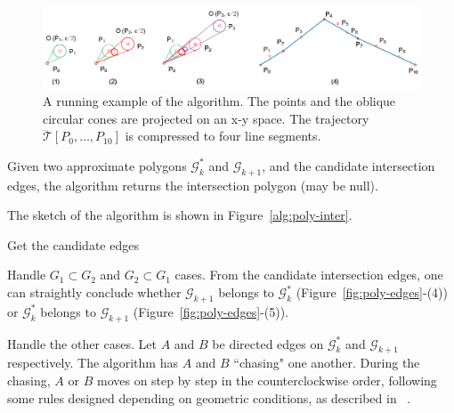 \begin{figure}[tb!]
\centering
\includegraphics[scale=0.8]{figures/Fig-ex-conest.png}
\vspace{-1ex}
\caption{\small A running example of the \cist algorithm. The points and the oblique circular cones are projected on an x-y space. The trajectory $\dddot{\mathcal{T}}[P_0, \ldots, P_{10}]$ is compressed to four line segments.}
\vspace{-2ex}
\label{fig:exm-const}
\end{figure}


\stitle{\textcolor[rgb]{0.00,0.07,1.00}{polygon intersection algorithm}}
Given two approximate polygons $\mathcal{G}^*_k$ and $\mathcal{G}_{k+1}$, and the candidate intersection edges, the algorithm returns the intersection polygon (may be null).

The sketch of the algorithm is shown in Figure~\ref{alg:poly-inter}.

Get the candidate edges

Handle $G_1 \subset G_2$ and $G_2 \subset G_1$ cases.
From the candidate intersection edges, one can straightly conclude whether $\mathcal{G}_{k+1}$ belongs to $\mathcal{G}^*_{k}$ (Figure~\ref{fig:poly-edges}-(4)) or $\mathcal{G}^*_{k}$ belongs to $\mathcal{G}_{k+1}$ (Figure~\ref{fig:poly-edges}-(5)).

%

Handle the other cases.
Let $A$ and $B$ be directed edges on $\mathcal{G}^*_k$ and $\mathcal{G}_{k+1}$ respectively. The algorithm has $A$ and $B$ ``chasing" one another. During the chasing, $A$ or $B$ moves on step by step in the counterclockwise order, following some rules designed depending on geometric conditions, as described in ~\cite{ORourke:Intersection}.









